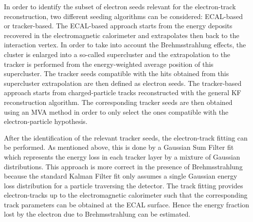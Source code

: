 In order to identify the subset of electron seeds relevant for the electron-track reconstruction, two different seeding algorithms can be considered: ECAL-based or tracker-based.
The ECAL-based approach starts from the energy deposits recovered in the electromagnetic calorimeter and extrapolates then back to the interaction vertex. In order to take into account the Brehmsstrahlung effects, the cluster is enlarged into a so-called supercluster and the extrapolation to the tracker is performed from the energy-weighted average position of this supercluster. The tracker seeds compatible with the hits obtained from this supercluster extrapolation are then defined as electron seeds. The tracker-based approach starts from charged-particle tracks reconstructed with the general KF reconstruction algorithm. The corresponding tracker seeds are then obtained using an MVA method in order to only select the ones compatible with the electron-particle hypothesis.

After the identification of the relevant tracker seeds, the electron-track fitting can be performed. As mentioned above, this is done by a Gaussian Sum Filter fit which represents the energy loss in each tracker layer by a mixture of Gaussian distributions. This approach is more correct in the presence of Brehmsstrahlung because the standard Kalman Filter fit only assumes a single Gaussian energy loss distribution for a particle traversing the detector. The track fitting provides electron-tracks up to the electromagnetic calorimeter such that the corresponding track parameters can be obtained at the ECAL surface. Hence the energy fraction lost by the electron due to Brehmsstrahlung can be estimated.


